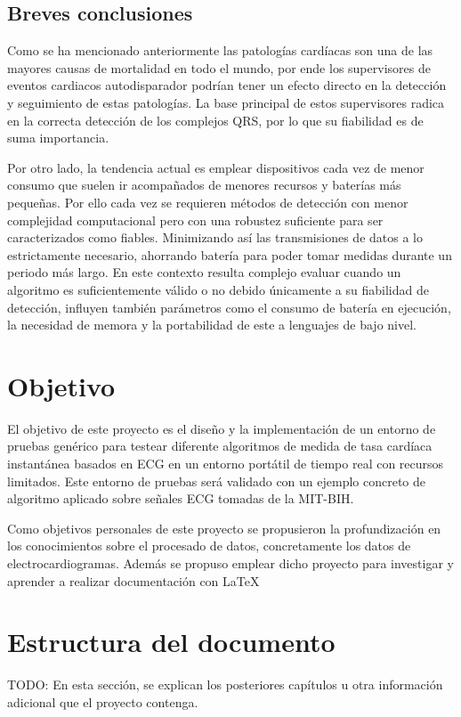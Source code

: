 \subsection{Breves conclusiones}

Como se ha mencionado anteriormente las patologías cardíacas son una de las mayores causas de mortalidad en todo el mundo, por ende los supervisores de eventos cardiacos autodisparador podrían tener un efecto directo en la detección y seguimiento de estas patologías. La base principal de estos supervisores radica en la correcta detección de los complejos QRS, por lo que su fiabilidad es de suma importancia.

Por otro lado, la tendencia actual es emplear dispositivos cada vez de menor consumo que suelen ir acompañados de menores recursos y baterías más pequeñas. Por ello cada vez se requieren métodos de detección con menor complejidad computacional pero con una robustez suficiente para ser caracterizados como fiables. Minimizando así las transmisiones de datos a lo estrictamente necesario, ahorrando batería para poder tomar medidas durante un periodo más largo. En este contexto resulta complejo evaluar cuando un algoritmo es suficientemente válido o no debido únicamente a su fiabilidad de detección, influyen también parámetros como el consumo de batería en ejecución, la necesidad de memora y la portabilidad de este a lenguajes de bajo nivel.

\section{Objetivo}
El objetivo de este proyecto es el diseño y la implementación de un entorno de pruebas genérico para testear diferente algoritmos de medida de tasa cardíaca instantánea basados en ECG en un entorno portátil de tiempo real con recursos limitados. Este entorno de pruebas será validado con un ejemplo concreto de algoritmo aplicado sobre señales ECG tomadas de la MIT-BIH.

Como objetivos personales de este proyecto se propusieron la profundización en los conocimientos sobre el procesado de datos, concretamente los datos de electrocardiogramas. Además se propuso emplear dicho proyecto para investigar y aprender a realizar documentación con \LaTeX


\section{Estructura del documento}
TODO: En esta sección, se explican los posteriores capítulos u otra información adicional que el proyecto contenga.

\chapterend
